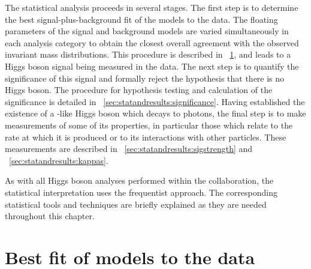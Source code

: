 The statistical analysis proceeds in several stages. The first step is to determine the best signal-plus-background fit of the models to the data. The floating parameters of the signal and background models are varied simultaneously in each analysis category to obtain the closest overall agreement with the observed invariant mass distributions. This procedure is described in \Sec~\ref{sec:statandresults:bestfit}, and leads to a Higgs boson signal being measured in the data. The next step is to quantify the significance of this signal and formally reject the hypothesis that there is no Higgs boson. The procedure for hypothesis testing and calculation of the significance is detailed in \Sec~\ref{sec:statandresults:significance}. Having established the existence of a \SM-like Higgs boson which decays to photons, the final step is to make measurements of some of its properties, in particular those which relate to the rate at which it is produced or to its interactions with other \SM particles. These measurements are described in \Sec~\ref{sec:statandresults:sigstrength} and \Sec~\ref{sec:statandresults:kappas}. 
 
As with all Higgs boson analyses performed within the \CMS collaboration, the statistical interpretation uses the frequentist approach. The corresponding statistical tools and techniques are briefly explained as they are needed throughout this chapter.

\section{Best fit of models to the data}
\label{sec:statandresults:bestfit}


